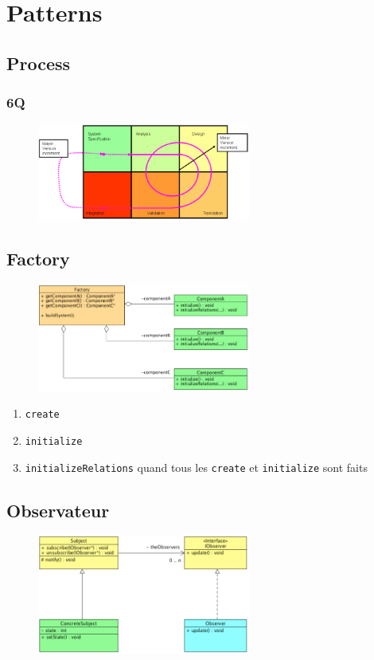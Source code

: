 \documentclass[resume]{subfiles}
\begin{document}
\section{Patterns}
\subsection{Process}
\subsubsection{6Q}
\begin{figure}[H]
\centering
\includegraphics[width=7.00cm]{img_3.png}
\end{figure}
\subsection{Factory}
\begin{figure}[H]
\centering
\includegraphics[width=7.00cm]{img_4.png}
\end{figure}
\begin{enumerate}
\item \verb!create!
\item \verb!initialize!
\item \verb!initializeRelations! quand tous les \verb!create! et \verb!initialize! sont faits
\end{enumerate}
\subsection{Observateur}
\begin{figure}[H]
\centering
\includegraphics[width=7.00cm]{img_5.png}
\end{figure}
\end{document}
